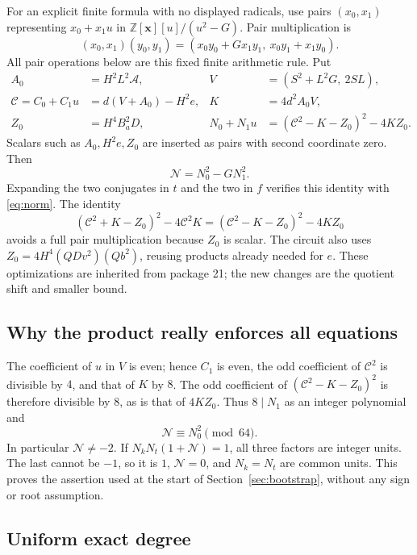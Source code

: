\documentclass[11pt]{article}
\theoremstyle{remark}\newtheorem{remark}[theorem]{Remark}
\newcommand{\Z}{\mathbb Z}\newcommand{\N}{\mathbb N}
\begin{document}
For an explicit finite formula with no displayed radicals, use pairs
$(x_0,x_1)$ representing $x_0+x_1u$ in
$\Z[\mathbf x][u]/(u^2-G)$. Pair multiplication is
\[
 (x_0,x_1)(y_0,y_1)=(x_0y_0+Gx_1y_1,\ x_0y_1+x_1y_0).
\]
All pair operations below are this fixed finite arithmetic rule. Put
\begin{align*}
 A_0&=H^2L^2\mathcal A,&V&=(S^2+L^2G,\ 2SL),\\
 \mathcal C=C_0+C_1u&=d(V+A_0)-H^2e,&K&=4d^2A_0V,\\
 Z_0&=H^4B_a^2D,&N_0+N_1u&=(\mathcal C^2-K-Z_0)^2-4KZ_0.
\end{align*}
Scalars such as $A_0,H^2e,Z_0$ are inserted as pairs with second
coordinate zero. Then
\begin{equation}
 \mathcal N=N_0^2-GN_1^2.\label{eq:pairnorm}
\end{equation}
Expanding the two conjugates in $t$ and the two in $f$ verifies this
identity with \eqref{eq:norm}. The identity
\[
 (\mathcal C^2+K-Z_0)^2-4\mathcal C^2K
 =(\mathcal C^2-K-Z_0)^2-4KZ_0
\]
avoids a full pair multiplication because $Z_0$ is scalar. The circuit
also uses $Z_0=4H^4(QDv^2)(Qb^2)$, reusing products already needed
for $e$. These optimizations are inherited from package 21; the new
changes are the quotient shift and smaller bound.

\subsection{Why the product really enforces all equations}
\label{sec:parity}

The coefficient of $u$ in $V$ is even; hence $C_1$ is even, the odd
coefficient of $\mathcal C^2$ is divisible by $4$, and that of $K$ by $8$.
The odd coefficient of $(\mathcal C^2-K-Z_0)^2$ is therefore divisible by $8$,
as is that of $4KZ_0$. Thus $8\mid N_1$ as an integer polynomial and
\[
 \mathcal N\equiv N_0^2\pmod{64}.
\]
In particular $\mathcal N\ne-2$. If
$N_kN_t(1+\mathcal N)=1$, all three factors are integer units.
The last cannot be $-1$, so it is $1$, $\mathcal N=0$, and $N_k=N_t$
are common units. This proves the assertion used at the start of
Section~\ref{sec:bootstrap}, without any sign or root assumption.

\subsection{Uniform exact degree}
\end{document}
